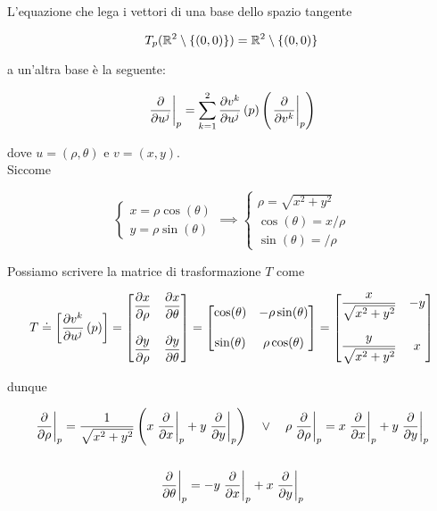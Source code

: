 L'equazione che lega i vettori di una base dello spazio tangente

\begin{equation}
	T_{p}(\mathbb{R}^{2} \setminus \{(0,0)\}) = \mathbb{R}^{2} \setminus \{(0,0)\}
\end{equation}

a un'altra base è la seguente:

\begin{equation}
	\eval{\pdv{u^{j}}}_{p} = \sum_{k=1}^{2} \pdv{v^{k}}{u^{j}} \, (p) \left( \eval{\pdv{v^{k}}}_{p} \right)
\end{equation}

dove $ u = (\rho,\theta) $ e $ v = (x,y) $.\\
Siccome

\begin{equation}
	\begin{cases}
		x = \rho \cos(\theta)\\
		y = \rho \sin(\theta)
	\end{cases}%
	\implies %
	\begin{cases}
		\rho = \sqrt{x^{2} + y^{2}}\\
		\cos(\theta) = x / \rho\\
		\sin(\theta) =  / \rho
	\end{cases}
\end{equation}

Possiamo scrivere la matrice di trasformazione $ T $ come

\begin{equation}
	T \doteq \left[ \pdv{v^{k}}{u^{j}} \, (p) \right] = \bmqty{ \dpdv{x}{\rho} & \dpdv{x}{\theta} \\\\ \dpdv{y}{\rho} & \dpdv{y}{\theta} } %
	= \bmqty{ \cos(\theta) & - \rho \sin(\theta) \\\\ \sin(\theta) & \rho \cos(\theta) } %
	= \bmqty{ \dfrac{x}{\sqrt{x^{2} + y^{2}}} & - y \\\\ \dfrac{y}{\sqrt{x^{2} + y^{2}}} & x }
\end{equation}

dunque

\begin{gather}
		\eval{\pdv{\rho}}_{p} = \dfrac{1}{\sqrt{x^{2} + y^{2}}} \left( x \eval{\pdv{x}}_{p} + y \eval{\pdv{y}}_{p} \right) %
		\quad \lor \quad %
		\rho \eval{\pdv{\rho}}_{p} = x \eval{\pdv{x}}_{p} + y \eval{\pdv{y}}_{p}\\
		\nonumber\\
		\eval{\pdv{\theta}}_{p} = - y \eval{\pdv{x}}_{p} + x \eval{\pdv{y}}_{p}
\end{gather}

